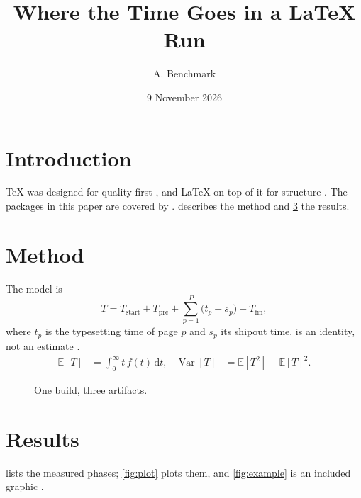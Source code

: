 \documentclass[11pt]{article}
\title{Where the Time Goes in a LaTeX Run}
\author{A. Benchmark}
\date{9 November 2026}
\begin{document}
\maketitle

\begin{abstract}
\lipsum[1][1-6]
\end{abstract}

\section{Introduction}\label{sec:intro}
\lipsum[2-4]
\TeX{} was designed for quality first \parencite{knuth:texbook,knuth:literate}, and \LaTeX{}
on top of it for structure \parencite{lamport:latex}. The packages in this paper are covered
by \textcite{mittelbach:companion}.  describes the method and
\cref{sec:results} the results.

\section{Method}\label{sec:method}
\lipsum[5-7]
The model is
\begin{equation}\label{eq:model}
  T = T_{\text{start}} + T_{\text{pre}} + \sum_{p=1}^{P} \bigl(t_p + s_p\bigr) + T_{\text{fin}},
\end{equation}
where $t_p$ is the typesetting time of page $p$ and $s_p$ its shipout time. 
is an identity, not an estimate \parencite{knuth:breaking,plass:pagination}.
\begin{align}
  \mathbb{E}[T] &= \int_0^\infty t\, f(t)\,\mathrm{d}t, &
  \operatorname{Var}[T] &= \mathbb{E}[T^2] - \mathbb{E}[T]^2.
\end{align}

\begin{figure}[htbp]
  \centering
  \caption{One build, three artifacts.}\label{fig:pipeline}
\end{figure}

\section{Results}\label{sec:results}
\lipsum[8-10]
 lists the measured phases; \cref{fig:plot} plots them, and
\cref{fig:example} is an included graphic \parencite{tantau:tikz,feuersaenger:pgfplots}.
\end{document}
